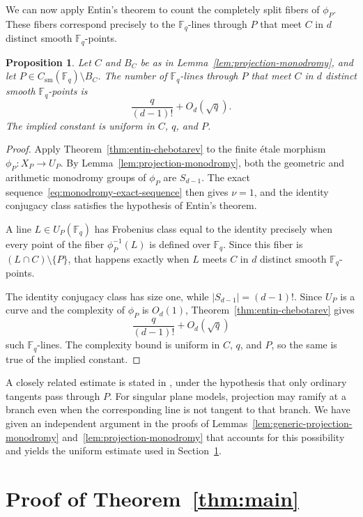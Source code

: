 \documentclass[10pt,a4paper]{amsart}
\newtheorem{proposition}[theorem]{Proposition}
\theoremstyle{definition}
\theoremstyle{remark}
\newcommand{\Fq}{\mathbb{F}_q}
\begin{document}
We can now apply Entin's theorem to count the completely split fibers of $\phi_P$. These fibers correspond precisely to the $\Fq$-lines through $P$ that meet $C$ in $d$ distinct smooth $\Fq$-points.

\begin{proposition}\label{prop:degree}
Let $C$ and $B_C$ be as in Lemma~\ref{lem:projection-monodromy}, and let
$P\in C_{\mathrm{sm}}(\Fq)\setminus B_C$. The number of $\Fq$-lines
through $P$ that meet $C$ in $d$ distinct smooth $\Fq$-points is
\[
\frac{q}{(d-1)!}+O_d(\sqrt q).
\]
The implied constant is uniform in $C$, $q$, and $P$.
\end{proposition}

\begin{proof}
Apply Theorem~\ref{thm:entin-chebotarev} to the finite \'etale morphism
$\phi_P\colon X_P\to U_P$. By Lemma~\ref{lem:projection-monodromy}, both the geometric and arithmetic monodromy groups of $\phi_P$ are $S_{d-1}$. The exact sequence~\eqref{eq:monodromy-exact-sequence} then gives $\nu=1$, and the identity conjugacy class satisfies the hypothesis of Entin's theorem.

A line $L\in U_P(\Fq)$ has Frobenius class equal to the identity precisely when every point of the fiber $\phi_P^{-1}(L)$ is defined over $\Fq$. Since this fiber is $(L\cap C)\setminus\{P\}$, that happens exactly when $L$ meets $C$ in $d$ distinct smooth $\Fq$-points.

The identity conjugacy class has size one, while $|S_{d-1}|=(d-1)!$. Since $U_P$ is a curve and the complexity of $\phi_P$ is $O_d(1)$, Theorem~\ref{thm:entin-chebotarev} gives
\[
\frac{q}{(d-1)!}+O_d(\sqrt q)
\]
such $\Fq$-lines. The complexity bound is uniform in $C$, $q$, and $P$, so the same is true of the implied constant.
\end{proof}

A closely related estimate is stated in
\cite[Proposition~10]{Die12}, under the hypothesis that only
ordinary tangents pass through $P$. For singular plane models, projection may ramify at a branch even when the corresponding line is not tangent to that branch. We have given an independent argument in the proofs of
Lemmas~\ref{lem:generic-projection-monodromy} and~\ref{lem:projection-monodromy} that accounts for this
possibility and yields the uniform estimate used in
Section~\ref{sec:main-thm}.

\section{Proof of Theorem~\ref{thm:main}}\label{sec:main-thm}
\end{document}
